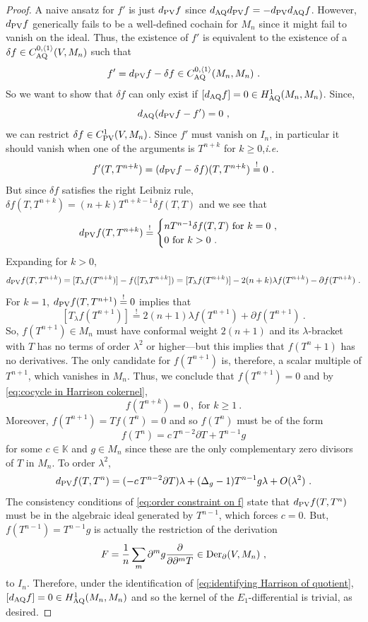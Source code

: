 \documentclass[11pt]{amsart}
\numberwithin{equation}{section}
\theoremstyle{definition}
\newcommand{\bb}{\mathbb}
\newcommand{\AQ}{{\textup{AQ}}}
\newcommand{\ik}{{\bb K}}
\newcommand{\Der}{{\textup{Der}}}
\newcommand{\PV}{{{\textup{PV}}}}
\newcommand{\0}{{\textbf{0}}}
\def \ie{{\it i.e.}}
\begin{document}
\begin{proof}
A naive ansatz for $f'$ is just $d_{\rm PV} f$ since $d_{\AQ} d_{\rm PV} f = -d_{\rm PV}d_{\AQ} f$. However, $d_{\rm PV} f$ generically fails to be a well-defined cochain for $M_n$ since it might fail to vanish on the ideal. Thus, the existence of $f'$ is equivalent to the existence of a $\delta f \in C^{0,\langle 1\rangle}_{\rm AQ}(V,M_n)$ such that  
\[
f'=d_{\rm PV}f -\delta f \in C_{\rm AQ}^{0,\langle 1\rangle}(M_n,M_n)~.
\]
So we want to show that $\delta f$ can only exist if $[d_{\AQ} f]=0\in H^1_{\AQ}(M_n,M_n)$. Since,
\[
d_{\AQ} ( d_{\rm PV} f - f') =0~,
\]
we can restrict $\delta f\in C^1_{\rm  PV}(V,M_n)$. Since $f'$ must vanish on $I_n$, in particular it should vanish when one of the arguments is $T^{n+k}$ for $k\ge0$,\ie
\[
f'(T,T^{n+k})=(d_{\rm PV}f-\delta f)(T,T^{n+k}) \overset{!}{=}0~.
\]
But since $\delta f$ satisfies the right Leibniz rule, $\delta f(T,T^{n+k}) =(n+k)T^{n+k-1}\delta f(T,T)$ and we see that
\begin{equation}\label{eq:order constraint on f}
d_{\rm PV}f(T,T^{n+k}) \overset{!}{=}
\begin{cases}
	nT^{n-1} \delta f(T,T) \text{ for } k=0~,\\
	0 \text{ for } k>0~.
\end{cases}
\end{equation}
Expanding for $k>0$,
\[
d_{\rm PV}f (T,T^{n+k}) = [T_\lambda f(T^{n+k})] - f([T_\lambda T^{n+k}]) =  [T_ \lambda f(T^{n+k})] - 2(n+k)\lambda f(T^{n+k}) - \partial f(T^{n+k})~.
\]
For $k=1$, $d_\PV f(T,T^{n+1})\overset{!}{=}0$ implies that
\[
 [T_{\lambda} f(T^{n+1})] \overset{!}{=} 2(n+1)\lambda f(T^{n+1}) + \partial f(T^{n+1}) ~.
\]
So, $f(T^{n+1})\in M_n$ must have conformal weight $2(n+1)$ and its $\lambda$-bracket with $T$ has no terms of order $\lambda^2$ or higher---but this implies that $f(T^n+1)$ has no derivatives. The only candidate for $f(T^{n+1})$ is, therefore, a scalar multiple  of $T^{n+1}$, which vanishes in $M_n$. Thus, we conclude that $f(T^{n+1})=0$ and by \eqref{eq:cocycle in Harrison cokernel}, 
\[
f(T^{n+k})=0 ~, \text{ for }k\ge1~.
\]
Moreover, $f(T^{n+1})=T f(T^n)=0$ and so $f(T^n)$ must be of the form
\[
 f(T^n) = c\, T^{n-2} \partial T + T^{n-1}g
\]
for some $c\in \ik$ and $g\in M_n$ since these are the only complementary zero divisors of $T$ in $M_n$. To order $\lambda^2$,
\[
d_{\rm PV}f(T,T^n) = (-c\, T^{n-2}\partial T )\lambda + (\Delta_g -1)T^{n-1}g \lambda + O(\lambda^2)~.
\]
The consistency conditions of \eqref{eq:order constraint on f} state that $d_{\rm PV}f(T,T^n)$ must be in the algebraic ideal generated by $T^{n-1}$, which forces $c=0$. But, $f(T^{n-1}) = T^{n-1} g$ is actually the restriction of the derivation 
\[
F = \frac1n \sum_m  \partial^m g \frac{\partial}{\partial \partial^m T}\in \Der_{\partial}(V,M_n)~,
\]
to $I_n$. Therefore, under the identification of \eqref{eq:identifying Harrison of quotient}, $[d_{\AQ} f]=0\in H^1_{\AQ}(M_n,M_n)$ and so the kernel of the $E_1$-differential is trivial, as desired.
\end{proof}
\end{document}
